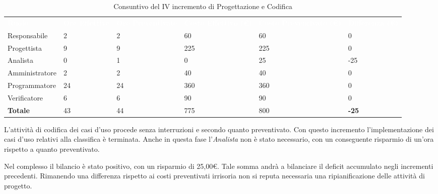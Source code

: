 \begin{table}[H]
\begin{center}
\renewcommand{\arraystretch}{1.5}
\begin{tabular}{ m{}<{\centering}  m{}<{\centering} m{}<{\centering} m{}<{\centering} m{}<{\centering} m{}<{\centering}}
	\rowcolor{darkblue}
	\textcolor{white}{\textbf{Ruolo}} & \textcolor{white}{\textbf{Ore Effettive}} & \textcolor{white}{\textbf{Ore Preventivate}}&\textcolor{white}{\textbf{Costo Effettivo (\euro)}}&\textcolor{white}{\textbf{Costo Preventivato (\euro)}}&\textcolor{white}{\textbf{Differenza (\euro)}}\\ 

	Responsabile  & 2 & 2 & 60 & 60 & 0\\	
	
	Progettista & 9 & 9 & 225 & 225 & 0\\
	
	Analista & 0 & 1 & 0 & 25 & -25\\
	
	Amministratore & 2 & 2 & 40 & 40 & 0\\
	
	Programmatore & 24 & 24 & 360 & 360 & 0\\
	
	Verificatore & 6 & 6 & 90 & 90 & 0\\
	
	\textbf{Totale} & 43 & 44 & 775 & 800 & \textbf{-25} \\
	
\end{tabular}
\caption{Consuntivo del IV incremento di Progettazione e Codifica}
\end{center}
\end{table}

L'attività di codifica dei casi d'uso procede senza interruzioni e secondo quanto preventivato. Con questo incremento l'implementazione dei casi d'uso relativi alla classifica è terminata. Anche in questa fase l'\textit{Analista} non è stato necessario, con un conseguente risparmio di un'ora rispetto a quanto preventivato. 

Nel complesso il bilancio è stato positivo, con un risparmio di 25,00\euro. Tale somma andrà a bilanciare il deficit accumulato negli incrementi precedenti. Rimanendo una differenza rispetto ai costi preventivati irrisoria non si reputa necessaria una ripianificazione delle attività di progetto.


